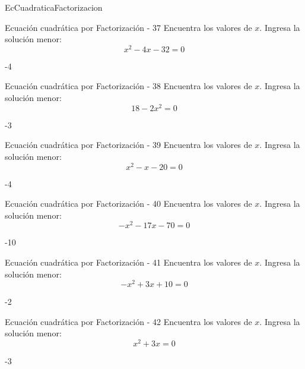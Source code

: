 \documentclass[a4,11pt]{aleph-notas}
\begin{document}
\begin{quiz}{EcCuadraticaFactorizacion}
\begin{numerical}[]%
    {Ecuación cuadrática por Factorización - 37}
    Encuentra los valores de $x$. Ingresa la solución menor:
    \[
        x^{2} - 4 x - 32 = 0
    \]
    \item[] -4
\end{numerical}

\begin{numerical}[]%
    {Ecuación cuadrática por Factorización - 38}
    Encuentra los valores de $x$. Ingresa la solución menor:
    \[
        18 - 2 x^{2} = 0
    \]
    \item[] -3
\end{numerical}

\begin{numerical}[]%
    {Ecuación cuadrática por Factorización - 39}
    Encuentra los valores de $x$. Ingresa la solución menor:
    \[
        x^{2} - x - 20 = 0
    \]
    \item[] -4
\end{numerical}

\begin{numerical}[]%
    {Ecuación cuadrática por Factorización - 40}
    Encuentra los valores de $x$. Ingresa la solución menor:
    \[
        - x^{2} - 17 x - 70 = 0
    \]
    \item[] -10
\end{numerical}

\begin{numerical}[]%
    {Ecuación cuadrática por Factorización - 41}
    Encuentra los valores de $x$. Ingresa la solución menor:
    \[
        - x^{2} + 3 x + 10 = 0
    \]
    \item[] -2
\end{numerical}

\begin{numerical}[]%
    {Ecuación cuadrática por Factorización - 42}
    Encuentra los valores de $x$. Ingresa la solución menor:
    \[
        x^{2} + 3 x = 0
    \]
    \item[] -3
\end{numerical}


\end{quiz}
\end{document}
